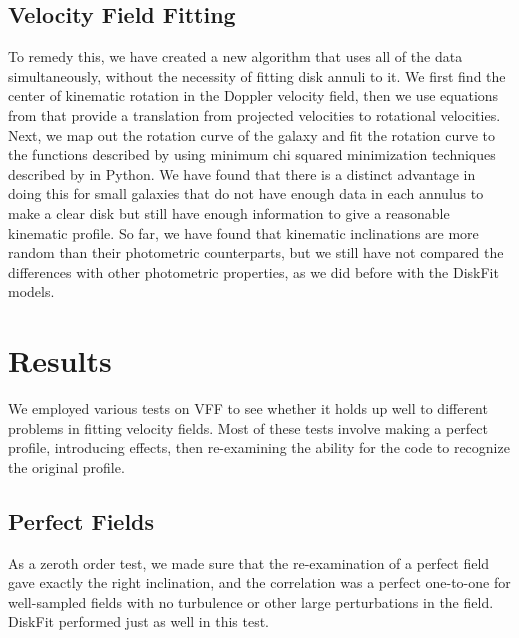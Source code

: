 \documentclass{emulateapj}
\begin{document}
\subsection{Velocity Field Fitting}

To remedy this, we have created a new algorithm that uses all of the data simultaneously, without the necessity of fitting disk annuli to it. We first find the center of kinematic rotation in the Doppler velocity field, then we use equations from \citet{teuben} that provide a translation from projected velocities to rotational velocities. Next, we map out the rotation curve of the galaxy and fit the rotation curve to the functions described by \citet{courteau} using minimum chi squared minimization techniques described by \citet{mpfit} in Python. We have found that there is a distinct advantage in doing this for small galaxies that do not have enough data in each annulus to make a clear disk but still have enough information to give a reasonable kinematic profile. So far, we have found that kinematic inclinations are more random than their photometric counterparts, but we still have not compared the differences with other photometric properties, as we did before with the DiskFit models.


\section{Results}
We employed various tests on VFF to see whether it holds up well to different problems in fitting velocity fields. Most of these tests involve making a perfect profile, introducing effects, then re-examining the ability for the code to recognize the original profile.
\subsection{Perfect Fields}
As a zeroth order test, we made sure that the re-examination of a perfect field gave exactly the right inclination, and the correlation was a perfect one-to-one for well-sampled fields with no turbulence or other large perturbations in the field. DiskFit performed just as well in this test.
\end{document}
